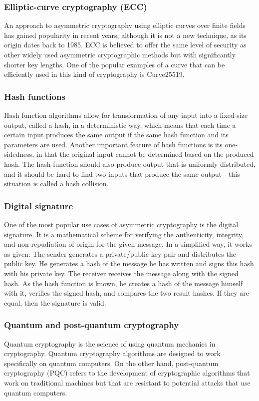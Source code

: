 \subsubsection{Elliptic-curve cryptography (ECC)}
An approach to asymmetric cryptography using elliptic curves over finite fields has gained popularity in recent years, although it is not a new technique, as its origin dates back to 1985. ECC is believed to offer the same level of security as other widely used asymmetric cryptographic methods but with significantly shorter key lengths. One of the popular examples of a curve that can be efficiently used in this kind of cryptography is Curve25519.

\subsubsection{Hash functions}
Hash function algorithms allow for transformation of any input into a fixed-size output, called a hash, in a deterministic way, which means that each time a certain input produces the same output if the same hash function and its parameters are used. Another important feature of hash functions is its one-sidedness, in that the original input cannot be determined based on the produced hash. The hash function should also produce output that is uniformly distributed, and it should be hard to find two inputs that produce the same output - this situation is called a hash collision.

\subsubsection{Digital signature}
One of the most popular use cases of asymmetric cryptography is the digital signature. It is a mathematical scheme for verifying the authenticity, integrity, and non-repudiation of origin for the given message. In a simplified way, it works as given: The sender generates a private/public key pair and distributes the public key. He generates a hash of the message he has written and signs this hash with his private key. The receiver receives the message along with the signed hash. As the hash function is known, he creates a hash of the message himself with it, verifies the signed hash, and compares the two result hashes. If they are equal, then the signature is valid.

\subsubsection{Quantum and post-quantum cryptography}
Quantum cryptography is the science of using quantum mechanics in cryptography. Quantum cryptography algorithms are designed to work specifically on quantum computers.
On the other hand, post-quantum cryptography (PQC) refers to the development of cryptographic algorithms that work on traditional machines but that are resistant to potential attacks that use quantum computers.

